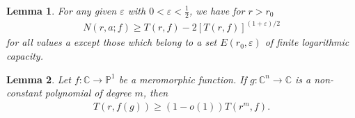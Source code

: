 \documentclass[11pt,reqno]{amsart}
\newtheorem{lem}{Lemma}[section]
\numberwithin{equation}{section}
\begin{document}
\begin{lem}\label{L1}\cite{Nevanlinna1936}
For any given $\varepsilon$ with $0<\varepsilon< \frac{1}{2}$, we have for $r>r_0$
\begin{align*}
	N(r,a;f)\geq T(r,f)-2\left\lbrack T(r,f)\right\rbrack^{(1+\varepsilon)/2}
\end{align*}	
for all values a except those which belong to a set $E(r_0,\varepsilon)$ of finite logarithmic capacity.
\end{lem}

\begin{lem}\label{L1.1} Let $f:\mathbb{C}\to \mathbb{P}^1$ be a meromorphic function. If $g:\mathbb{C}^n\to \mathbb{C}$ is a non-constant polynomial of degree $m$, then 
	\begin{align*}
		T(r,f(g))\geq (1-o(1))T(r^m,f).
	\end{align*}
	\end{lem}
	
\end{document}
